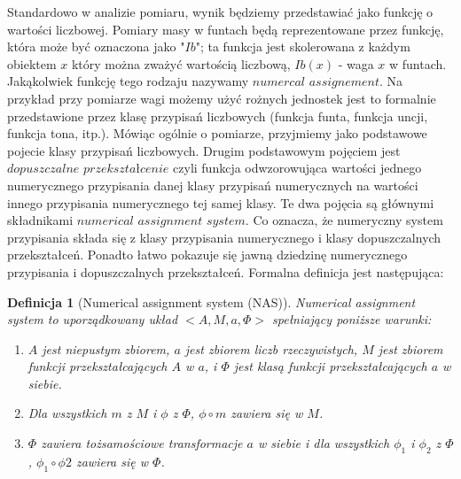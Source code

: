 \documentclass[12pt,a4paper]{report}
\newtheorem{definition}{Definicja}
\begin{document}
Standardowo w analizie pomiaru, wynik będziemy przedstawiać jako funkcję o wartości liczbowej. Pomiary masy w funtach będą reprezentowane przez funkcję, która może być oznaczona jako "$Ib$";  ta funkcja jest skolerowana z każdym obiektem $x$ który można zważyć wartością liczbową, $Ib(x)$ - waga $x$ w funtach. Jakąkolwiek funkcję tego rodzaju nazywamy $numercal$ $assignement$. Na przykład przy pomiarze wagi możemy użyć rożnych jednostek jest to formalnie przedstawione  przez klasę przypisań liczbowych (funkcja funta, funkcja uncji, funkcja tona, itp.). Mówiąc ogólnie o pomiarze, przyjmiemy jako podstawowe pojecie klasy przypisań liczbowych. Drugim podstawowym pojęciem jest $dopuszczalne$ $przekształcenie$ czyli funkcja odwzorowująca wartości jednego numerycznego przypisania danej klasy przypisań numerycznych na wartości innego przypisania numerycznego tej samej klasy. Te dwa pojęcia są głównymi składnikami $numerical$ $assignment$ $system$. Co oznacza, że numeryczny system przypisania składa się z klasy przypisania numerycznego i klasy dopuszczalnych przekształceń. Ponadto łatwo pokazuje się jawną dziedzinę numerycznego przypisania i dopuszczalnych przekształceń. Formalna definicja jest następująca:
\begin{definition}[Numerical assignment system (NAS)]
Numerical assignment system to uporządkowany układ $<A, M, a, \Phi>$ spełniający poniższe warunki:
\begin{enumerate}
\item
$A$ jest niepustym zbiorem, $a$ jest zbiorem liczb rzeczywistych, $M$ jest zbiorem funkcji przekształcających $A$ w $a$, i $\Phi$ jest klasą funkcji przekształcających $a$ w siebie.  
\item
Dla wszystkich $m$ z $M$ i $\phi$ z $\Phi$, $\phi \circ m$ zawiera się w $M$. 
\item
$\Phi$ zawiera tożsamościowe transformacje $a$ w siebie i dla wszystkich $\phi_{1}$ i $\phi_{2}$ z $\Phi$, $\phi_{1} \circ \phi{2}$ zawiera się w $\Phi$.

\end{enumerate}

\end{definition}
\end{document}
